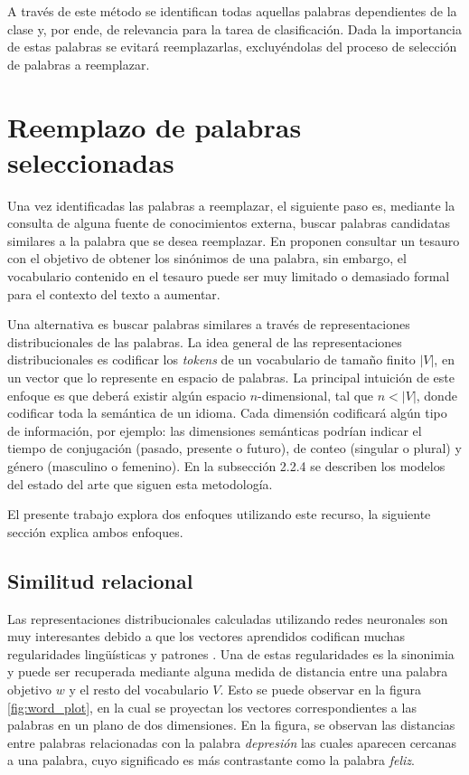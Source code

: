 A través de este método se identifican todas aquellas palabras dependientes de la clase y, por ende, de relevancia para la tarea de clasificación. Dada la importancia de estas palabras se evitará reemplazarlas, excluyéndolas del proceso de selección de palabras a reemplazar.

\section{Reemplazo de palabras seleccionadas}

Una vez identificadas las palabras a reemplazar, el siguiente paso es, mediante la consulta de alguna fuente de conocimientos externa, buscar palabras candidatas similares a la palabra que se desea reemplazar. En \citep{zhang2015character} proponen consultar un tesauro con el objetivo de obtener los sinónimos de una palabra, sin embargo, el vocabulario contenido en el tesauro puede ser muy limitado o demasiado formal para el contexto del texto a aumentar. 

Una alternativa es buscar palabras similares a través de representaciones distribucionales de las palabras. La idea general de las representaciones distribucionales es codificar los \textit{tokens} de un vocabulario de tamaño finito $|V|$, en un vector que lo represente en espacio de palabras. La principal intuición de este enfoque es que deberá existir algún espacio $n$-dimensional, tal que $n<|V|$, donde codificar toda la semántica de un idioma. Cada dimensión codificará algún tipo de información, por ejemplo: las dimensiones semánticas podrían indicar el tiempo de conjugación (pasado, presente o futuro), de conteo (singular o plural) y género (masculino o femenino). En la subsección 2.2.4 se describen los modelos del estado del arte que siguen esta metodología.

El presente trabajo explora dos enfoques utilizando este recurso, la siguiente sección explica ambos enfoques.

\subsection{Similitud relacional}

Las representaciones distribucionales calculadas utilizando redes neuronales son muy interesantes debido a que los vectores aprendidos codifican muchas regularidades lingüísticas y patrones \citep{mikolov2013distributed}. Una de estas regularidades es la sinonimia y puede ser recuperada mediante alguna medida de distancia entre una palabra objetivo $w$ y el resto del vocabulario $V$. Esto se puede observar en la figura \ref{fig:word_plot}, en la cual se proyectan los vectores correspondientes a las palabras en un plano de dos dimensiones. En la figura, se observan las distancias entre palabras relacionadas con la palabra \textit{depresión} las cuales aparecen cercanas a una palabra, cuyo significado es más contrastante como la palabra \textit{feliz}. 

